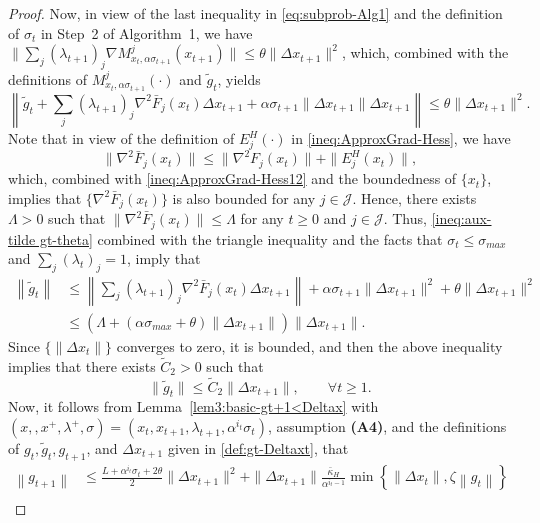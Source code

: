 \documentclass[10pt,a4paper]{amsart}
\newcommand{\J}{\mathcal{J}}
\begin{document}
\begin{proof}
Now, in view of the last inequality in \eqref{eq:subprob-Alg1} and the definition of $\sigma_t$ in Step~2 of Algorithm~1, we have  $\|\sum_{j}(\lambda_{t+1})_j\nabla M^j_{x_t,\alpha\sigma_{t+1}}(x_{t+1})\|\leq \theta\|\Delta x_{t+1}\|^2$, which, combined with   the definitions of $M^j_{x_t,\alpha\sigma_{t+1}}(\cdot)$ and $\tilde g_t$, yields
\begin{equation}\label{ineq:aux-tilde gt-theta}
\left\|\tilde g_t +\sum_j(\lambda_{t+1})_j\nabla^2 \bar F_j(x_t)\Delta x_{t+1}+\alpha\sigma_{t+1}\|\Delta x_{t+1}\|\Delta x_{t+1}\right\|\leq \theta\|\Delta x_{t+1}\|^2.
\end{equation}
Note that in view of the definition of $E^H_j(\cdot)$ in \eqref{ineq:ApproxGrad-Hess}, we have
$$
\|\nabla^2 \bar  F_j(x_t)\|\leq \|\nabla^2 F_j(x_t)\|+\|E^H_j(x_t)\|,
$$
which, combined with  \eqref{ineq:ApproxGrad-Hess12} and the boundedness of $\{x_t\}$, implies that  $\{\nabla^2\bar F_j(x_t)\}$ is also bounded for any $j \in \J$. Hence, there exists $\Lambda>0$ such that $\|\nabla^2\bar F_j(x_t)\|\leq \Lambda$ for any $t\geq 0$ and $j \in \J$. Thus, \eqref{ineq:aux-tilde gt-theta} combined with the triangle inequality and the facts that $\sigma_t\leq \sigma_{max}$ and $\sum_j(\lambda_t)_j=1$, imply that
 \begin{align*}
\left\|\tilde g_t\right\| &\leq   \left\|\sum_j(\lambda_{t+1})_j\nabla^2 \bar F_j(x_t)\Delta x_{t+1}\right\|+\alpha\sigma_{t+1}\|\Delta x_{t+1}\|^2+\theta\|\Delta x_{t+1}\|^2 \\
&\leq \left(\Lambda+(\alpha\sigma_{max}+\theta)\|\Delta x_{t+1}\|\right)\|\Delta x_{t+1}\|.
 \end{align*}
 Since $\{\|\Delta x_{t}\|\}$ converges to zero, it is bounded, and then the above inequality implies that  there exists $\tilde C_2>0$ such that 
 \begin{equation}\label{aux-ineq123}
 \|\tilde g_t\|\leq \tilde C_2\|\Delta x_{t+1}\|,\qquad \forall t\geq 1.
 \end{equation}
Now,  it follows from Lemma~\ref{lem3:basic-gt+1<Deltax} with $(x,,x^+,\lambda^+,\sigma)=(x_t,x_{t+1},\lambda_{t+1},\alpha^{i_t}\sigma_t)$, assumption {\bf (A4)}, and the definitions of $g_t, \tilde g_t, g_{t+1}$, and $\Delta x_{t+1}$ given in \eqref{def:gt-Deltaxt}, that 
 \begin{align*}
\left\|g_{t+1}\right\|&\leq \frac{L+\alpha^{i_t}\sigma_t+2\theta}{2}\|\Delta x_{t+1}\|^2+ \|\Delta x_{t+1}\|\frac{\bar \kappa_{H}}{\alpha^{i_t-1}}\min\left\{ \|\Delta x_{t}\|, \zeta\left\|g_t\right\| \right\}\\

\end{align*}
\end{proof}
\end{document}
